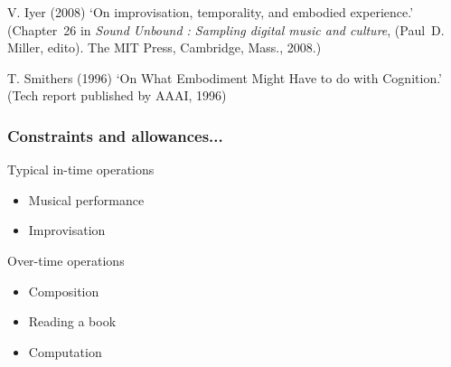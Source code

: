 \documentclass{beamer}
\begin{document}
\begin{frame}%
  \begin{thebibliography}{Vijay Iyer, 2008}
    V. Iyer (2008)
    \newblock `On improvisation, temporality, and embodied experience.'
    \newblock (Chapter~26 in \emph{Sound Unbound : Sampling digital music and culture}, (Paul~D. Miller, edito). The MIT Press, Cambridge, Mass., 2008.)
    
    \pause[2]
    T. Smithers (1996)
    \newblock `On What Embodiment Might Have to do with Cognition.'
    \newblock (Tech report published by AAAI, 1996)
  \end{thebibliography}
\end{frame}

\begin{frame}
  \frametitle{Constraints and allowances...}
  \begin{block}{Typical in-time operations}
    \begin{itemize}
    \item <2->Musical performance
    \item <3->Improvisation
    \end{itemize}
  \end{block}
  \pause[4]
  \begin{block}{Over-time operations}
    \begin{itemize}
    \item <5->Composition
    \item <6->Reading a book
    \item<7-> Computation
    \end{itemize}
  \end{block}
\end{frame}
\end{document}
